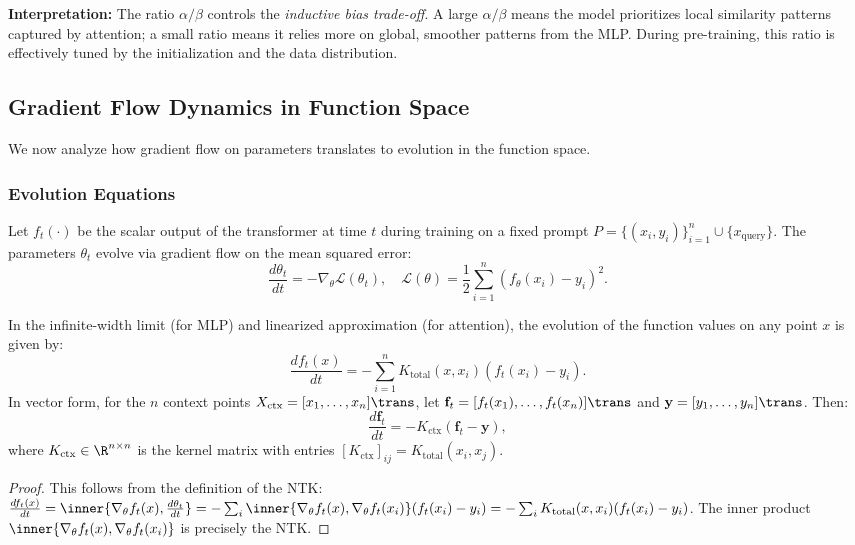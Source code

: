 	\textbf{Interpretation:}
	The ratio $\alpha/\beta$ controls the \textit{inductive bias trade-off}. A large $\alpha/\beta$ means the model prioritizes local similarity patterns captured by attention; a small ratio means it relies more on global, smoother patterns from the MLP. During pre-training, this ratio is effectively tuned by the initialization and the data distribution.
	
	\subsection{Gradient Flow Dynamics in Function Space}
	\label{subsec:gradient_flow}
	
	We now analyze how gradient flow on parameters translates to evolution in the function space.
	
	\subsubsection{Evolution Equations}
	\label{subsubsec:evolution_eqns}
	
	Let $f_t(\cdot)$ be the scalar output of the transformer at time $t$ during training on a fixed prompt $P = \{(x_i, y_i)\}_{i=1}^n \cup \{x_{\text{query}}\}$. The parameters $\theta_t$ evolve via gradient flow on the mean squared error:
	\[
	\frac{d\theta_t}{dt} = -\nabla_{\theta} \mathcal{L}(\theta_t), \quad \mathcal{L}(\theta) = \frac{1}{2}\sum_{i=1}^n (f_{\theta}(x_i) - y_i)^2.
	\]
	
	\begin{lemma}
		\label{lem:func_dynamics}
		In the infinite-width limit (for MLP) and linearized approximation (for attention), the evolution of the function values on any point $x$ is given by:
		\[
		\frac{df_t(x)}{dt} = -\sum_{i=1}^n K_{\text{total}}(x, x_i) (f_t(x_i) - y_i).
		\]
		In vector form, for the $n$ context points $X_{\text{ctx}} = [x_1, \dots, x_n]\trans$, let $\mathbf{f}_t = [f_t(x_1), \dots, f_t(x_n)]\trans$ and $\mathbf{y} = [y_1, \dots, y_n]\trans$. Then:
		\[
		\frac{d\mathbf{f}_t}{dt} = - K_{\text{ctx}} (\mathbf{f}_t - \mathbf{y}),
		\]
		where $K_{\text{ctx}} \in \R^{n \times n}$ is the kernel matrix with entries $[K_{\text{ctx}}]_{ij} = K_{\text{total}}(x_i, x_j)$.
	\end{lemma}
	
	\begin{proof}
		This follows from the definition of the NTK: $\frac{df_t(x)}{dt} = \inner{\nabla_{\theta} f_t(x), \frac{d\theta_t}{dt}} = -\sum_{i} \inner{\nabla_{\theta} f_t(x), \nabla_{\theta} f_t(x_i)} (f_t(x_i)-y_i) = -\sum_i K_{\text{total}}(x, x_i)(f_t(x_i)-y_i)$. The inner product $\inner{\nabla_{\theta} f_t(x), \nabla_{\theta} f_t(x_i)}$ is precisely the NTK.
	\end{proof}
	

